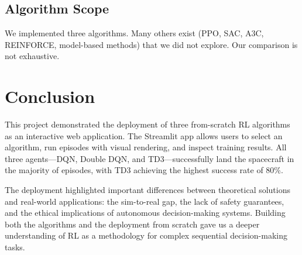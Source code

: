 \documentclass[11pt,a4paper]{article}
\begin{document}
\subsection{Algorithm Scope}

We implemented three algorithms. Many others exist (PPO, SAC, A3C, REINFORCE, model-based methods) that we did not explore. Our comparison is not exhaustive.

\section{Conclusion}

This project demonstrated the deployment of three from-scratch RL algorithms as an interactive web application. The Streamlit app allows users to select an algorithm, run episodes with visual rendering, and inspect training results. All three agents---DQN, Double DQN, and TD3---successfully land the spacecraft in the majority of episodes, with TD3 achieving the highest success rate of 80\%.

The deployment highlighted important differences between theoretical solutions and real-world applications: the sim-to-real gap, the lack of safety guarantees, and the ethical implications of autonomous decision-making systems. Building both the algorithms and the deployment from scratch gave us a deeper understanding of RL as a methodology for complex sequential decision-making tasks.
\end{document}

